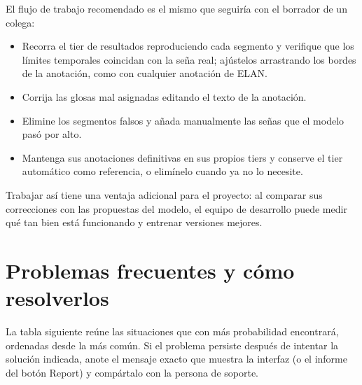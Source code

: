 \documentclass[12pt,a4paper]{article}
\begin{document}
El flujo de trabajo recomendado es el mismo que seguiría con el borrador de un colega:

\begin{itemize}[noitemsep, topsep=2pt]
    \item Recorra el tier de resultados reproduciendo cada segmento y verifique que los límites temporales coincidan con la seña real; ajústelos arrastrando los bordes de la anotación, como con cualquier anotación de ELAN.
    \item Corrija las glosas mal asignadas editando el texto de la anotación.
    \item Elimine los segmentos falsos y añada manualmente las señas que el modelo pasó por alto.
    \item Mantenga sus anotaciones definitivas en sus propios tiers y conserve el tier automático como referencia, o elimínelo cuando ya no lo necesite.
\end{itemize}

Trabajar así tiene una ventaja adicional para el proyecto: al comparar sus correcciones con las propuestas del modelo, el equipo de desarrollo puede medir qué tan bien está funcionando y entrenar versiones mejores.

\section{Problemas frecuentes y cómo resolverlos}

La tabla siguiente reúne las situaciones que con más probabilidad encontrará, ordenadas desde la más común. Si el problema persiste después de intentar la solución indicada, anote el mensaje exacto que muestra la interfaz (o el informe del botón Report) y compártalo con la persona de soporte.
\end{document}

